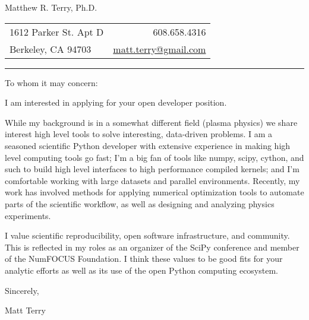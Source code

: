 \documentclass[letterpaper,11pt]{article}
\def\name{Matthew R. Terry, Ph.D.}
\begin{document}
\name

\vspace{-0.17in}
\begin{tabular*}{\textwidth}{@{}l @{\extracolsep{\fill}} r}
	1612 Parker St. Apt D  	& 608.658.4316 \\
	Berkeley, CA 94703 		& \href{mailto:matt.terry@gmail.com}{matt.terry@gmail.com}
\end{tabular*}

\hrule

\vspace{0.8in}

To whom it may concern:

I am interested in applying for your open developer position.

While my background is in a somewhat different field (plasma physics) we share
interest high level tools to solve interesting, data-driven problems.
I am a seasoned scientific Python developer with extensive
experience in making high level computing tools go fast;  I'm a big fan of
tools like numpy, scipy, cython, and such to build high level interfaces to
high performance compiled kernels; and I'm comfortable working with large
datasets and parallel environments.  Recently, my work has involved methods for
applying numerical optimization tools to automate parts of the scientific
workflow, as well as designing and analyzing physics experiments.

I value scientific reproducibility, open software infrastructure, and
community.  This is reflected in my roles as an organizer of the SciPy
conference and member of the NumFOCUS Foundation.  I think these values to be
good fits for your analytic efforts as well as its use of the open
Python computing ecosystem.


Sincerely,

Matt Terry

\vspace{0.5in}
\end{document}
